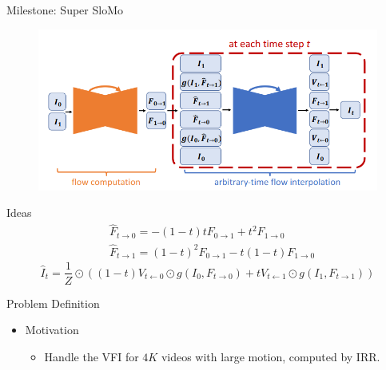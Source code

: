 \documentclass[aspectratio=43]{beamer}
\begin{document}
	\begin{frame}{Milestone: Super SloMo}
		\begin{figure}
			\centering\includegraphics[width=0.7\linewidth]{images/smm.png}
		\end{figure}
		\begin{block}{Ideas}
			$$
			\begin{aligned}
			&\hat{F}_{t \rightarrow 0}=-(1-t) t F_{0 \rightarrow 1}+t^{2} F_{1 \rightarrow 0} \\
			&\hat{F}_{t \rightarrow 1}=(1-t)^{2} F_{0 \rightarrow 1}-t(1-t) F_{1 \rightarrow 0}
			\end{aligned}
			$$
			$$
			\hat{I}_{t}=\frac{1}{Z} \odot\left((1-t) V_{t \leftarrow 0} \odot g\left(I_{0}, F_{t \rightarrow 0}\right)+t V_{t \leftarrow 1} \odot g\left(I_{1}, F_{t \rightarrow 1}\right)\right)
			$$
		\end{block}
	\end{frame}

	\begin{frame}{Problem Definition}
		\begin{itemize}
			\item Motivation
			\begin{itemize}
				\item Handle the VFI for $4K$ videos with large motion, computed by IRR.
			\end{itemize} 
		\end{itemize}
		\begin{figure}
			\centering
		\end{figure}

	\end{frame}
\end{document}
